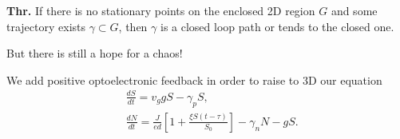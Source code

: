 \textbf{Thr.} If there is no stationary points on the enclosed 2D region $G$ and some trajectory exists $\gamma \subset G$, then $\gamma$ is a closed loop path or tends to the closed one.

\phantom{239}

But there is still a hope for a chaos!

\phantom{239}

We add positive optoelectronic feedback in order to raise to 3D our equation
\begin{align}
	&\frac{d S}{d t} = v_g g S - \gamma_p S,\\
	&\frac{d N}{d t} = \frac{J}{e d}[1 + \frac{\xi S(t-\tau)}{S_0}] - \gamma_n N - g S.
\end{align}